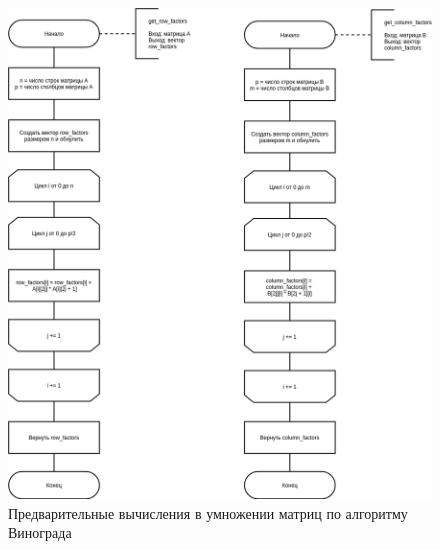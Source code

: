 \begin{figure}[H]
	\begin{center}
		\includegraphics[scale=0.5]{img/factors_winograd.png}
	\end{center}
	\captionsetup{justification=centering}
	\caption{Предварительные вычисления в умножении матриц по алгоритму Винограда}
	\label{img:factors_winograd}
\end{figure}

